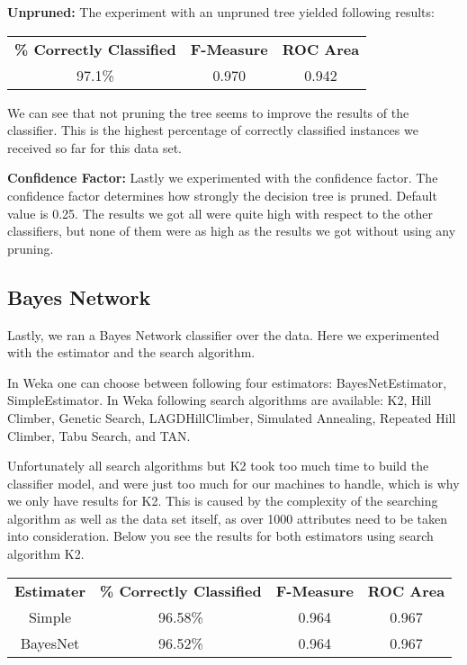 \documentclass{sig-alternate-05-2015}
\begin{document}
{\textbf{Unpruned:}
The experiment with an unpruned tree yielded following results:

\begin{center}
\begin{tabular}{c | c | c}
\textbf{\% Correctly Classified} & \textbf{F-Measure} & \textbf{ROC Area}\\
97.1\% & 0.970 & 0.942\\
\end{tabular}
\end{center}

We can see that not pruning the tree seems to improve the results of the classifier. This is the highest percentage of correctly classified instances we received so far for this data set.

\textbf{Confidence Factor:}
Lastly we experimented with the confidence factor. The confidence factor determines how strongly the decision tree is pruned. Default value is 0.25. The results we got all were quite high with respect to the other classifiers, but none of them were as high as the results we got without using any pruning. 

\subsection{Bayes Network}
Lastly, we ran a Bayes Network classifier over the data. Here we experimented with the estimator and the search algorithm.

In Weka one can choose between following four estimators: BayesNetEstimator, SimpleEstimator.
In Weka following search algorithms are available: K2, Hill Climber, Genetic Search, LAGDHillClimber, Simulated Annealing, Repeated Hill Climber, Tabu Search, and TAN.

Unfortunately all search algorithms but K2 took too much time to build the classifier model, and were just too much for our machines to handle, which is why we only have results for K2. This is caused by the complexity of the searching algorithm as well as the data set itself, as over 1000 attributes need to be taken into consideration. Below you see the results for both estimators using search algorithm K2.

\begin{center}
\begin{tabular}{ c | c | c | c}
\textbf{Estimater} & \textbf{\% Correctly Classified} & \textbf{F-Measure} & \textbf{ROC Area}\\
Simple   & 96.58\% & 0.964 & 0.967\\
BayesNet & 96.52\% & 0.964 & 0.967\\
\end{tabular}
\end{center}

}
\end{document}
